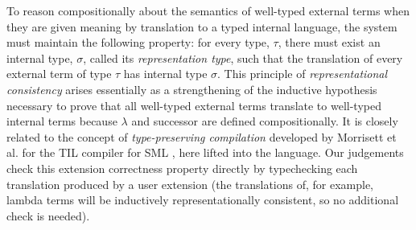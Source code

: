 \documentclass[10pt,preprint]{sigplanconf}
\begin{document}
{To reason compositionally about the semantics of well-typed external terms when they are given meaning by translation to a typed internal language, the system must maintain the following property: for every  type, $\tau$, there must exist an internal type, $\sigma$, called its \emph{representation type}, such that the translation of every external term of type $\tau$ has internal type $\sigma$. This principle of \emph{representational consistency} arises essentially as a strengthening of the inductive hypothesis necessary to prove that all well-typed external terms translate to well-typed internal terms because $\lambda$ and successor are defined compositionally. It is closely related to the concept of \emph{type-preserving compilation} developed by Morrisett et al. for the TIL compiler for SML \cite{tarditi+:til-OLD}, here lifted into the language. Our judgements check this extension correctness property directly by typechecking each translation produced by a user extension (the translations of, for example, lambda terms will be inductively representationally consistent, so no additional check is needed).%

}
\end{document}
